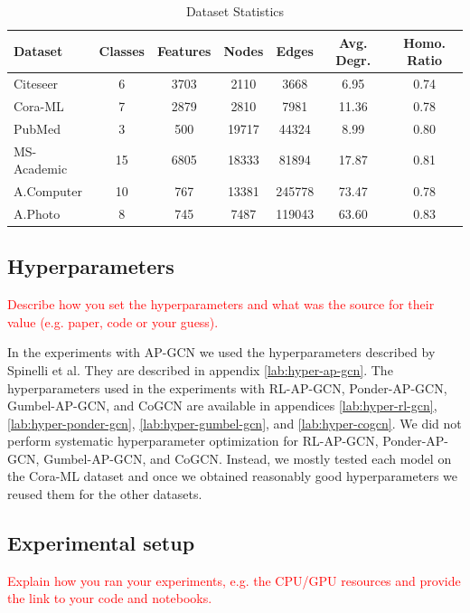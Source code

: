 \documentclass{gdl}
\begin{document}
\begin{table}[h]
    \footnotesize\sf
    \setlength{\tabcolsep}{1pt}
    \caption{Dataset Statistics}
    \begin{tabular}{l c c c c c c}
        \toprule
        Dataset & Classes & Features & Nodes & Edges & Avg. Degr. & Homo. Ratio \\
        \midrule
        Citeseer & 6 & 3703 & 2110 & 3668 & 6.95 & 0.74 \\
        Cora-ML & 7 & 2879 & 2810 & 7981 & 11.36 & 0.78 \\
        PubMed & 3 & 500 & 19717 &44324 &8.99 & 0.80 \\
        MS-Academic & 15&6805 & 18333 & 81894 & 17.87 & 0.81 \\
        A.Computer & 10 & 767 & 13381 & 245778 & 73.47 & 0.78 \\
        A.Photo  & 8 & 745 & 7487 & 119043 & 63.60 & 0.83 \\
        \bottomrule
    \end{tabular}
    \label{tab:dataset_statistics}
\end{table}

\subsection{Hyperparameters}
\textcolor{red}{Describe how you set the hyperparameters and what was the source for their value (e.g. paper, code or your guess). }

In the experiments with AP-GCN we used the hyperparameters described by Spinelli et al. They are described in appendix \ref{lab:hyper-ap-gcn}. The hyperparameters used in the experiments with RL-AP-GCN, Ponder-AP-GCN, Gumbel-AP-GCN, and CoGCN are available in appendices \ref{lab:hyper-rl-gcn}, \ref{lab:hyper-ponder-gcn}, \ref{lab:hyper-gumbel-gcn}, and \ref{lab:hyper-cogcn}. We did not perform systematic hyperparameter optimization for RL-AP-GCN, Ponder-AP-GCN, Gumbel-AP-GCN, and CoGCN. Instead, we mostly tested each model on the Cora-ML dataset and once we obtained reasonably good hyperparameters we reused them for the other datasets. 

\subsection{Experimental setup}
\label{sec:experimental-setup}
\textcolor{red}{Explain how you ran your experiments, e.g. the CPU/GPU resources and provide the link to your code and notebooks.}
\end{document}
